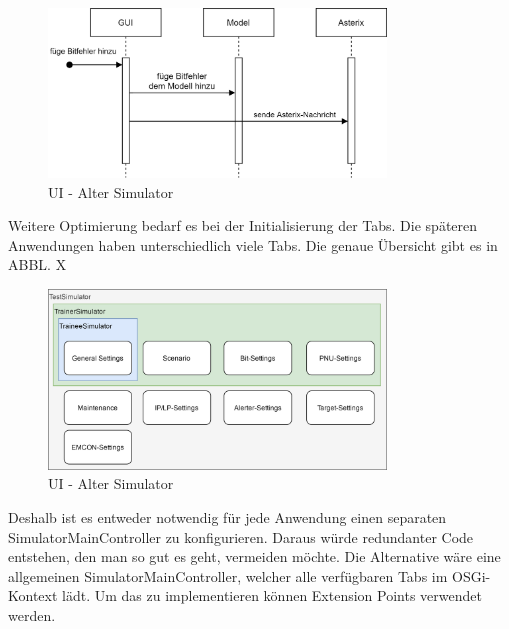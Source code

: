 \begin{figure}[h]
    \centering
    \includegraphics[width=0.8\textwidth]{content/assets/Kapitel3/AlterSimulator.png}
    \caption{UI - Alter Simulator}
\end{figure}

Weitere Optimierung bedarf es bei der Initialisierung der Tabs. Die späteren Anwendungen haben unterschiedlich viele Tabs. Die genaue Übersicht gibt es 
in ABBL. X

\begin{figure}[h]
    \centering
    \includegraphics[width=0.8\textwidth]{content/assets/Kapitel3/TabsPerApp.png}
    \caption{UI - Alter Simulator}
\end{figure}

Deshalb ist es entweder notwendig für jede Anwendung einen separaten SimulatorMainController zu konfigurieren. Daraus würde redundanter Code entstehen, 
den man so gut es geht, vermeiden möchte. Die Alternative wäre eine allgemeinen SimulatorMainController, welcher alle verfügbaren Tabs im OSGi-Kontext 
lädt. Um das zu implementieren können Extension Points verwendet werden.
